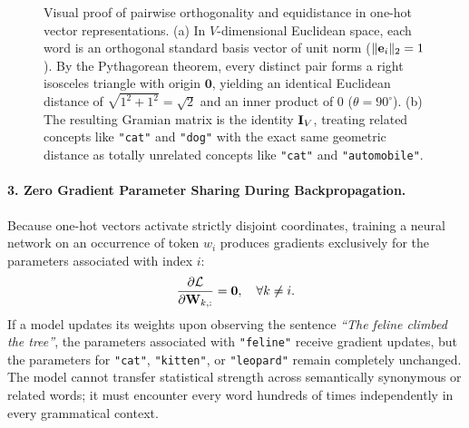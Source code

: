\documentclass[../../main.tex]{subfiles}
\begin{document}
\begin{figure}[htbp]
\caption{Visual proof of pairwise orthogonality and equidistance in one-hot vector representations. (a) In $V$-dimensional Euclidean space, each word is an orthogonal standard basis vector of unit norm ($\|\mathbf{e}_i\|_2 = 1$). By the Pythagorean theorem, every distinct pair forms a right isosceles triangle with origin $\mathbf{0}$, yielding an identical Euclidean distance of $\sqrt{1^2 + 1^2} = \sqrt{2}$ and an inner product of $0$ ($\theta = 90^\circ$). (b) The resulting Gramian matrix is the identity $\mathbf{I}_V$, treating related concepts like \texttt{"cat"} and \texttt{"dog"} with the exact same geometric distance as totally unrelated concepts like \texttt{"cat"} and \texttt{"automobile"}.}
\label{fig:onehot_orthogonality_geometry}
\end{figure}

\paragraph{3. Zero Gradient Parameter Sharing During Backpropagation.}
Because one-hot vectors activate strictly disjoint coordinates, training a neural network on an occurrence of token $w_i$ produces gradients exclusively for the parameters associated with index $i$:
\begin{equation}
\label{eq:weight_update_isolation}
\frac{\partial \mathcal{L}}{\partial \mathbf{W}_{k, :}} = \mathbf{0}, \quad \forall k \neq i.
\end{equation}
If a model updates its weights upon observing the sentence \emph{``The feline climbed the tree''}, the parameters associated with \texttt{"feline"} receive gradient updates, but the parameters for \texttt{"cat"}, \texttt{"kitten"}, or \texttt{"leopard"} remain completely unchanged. The model cannot transfer statistical strength across semantically synonymous or related words; it must encounter every word hundreds of times independently in every grammatical context.
\end{document}
